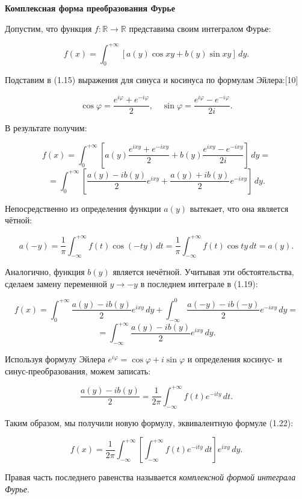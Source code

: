 \textbf{Комплексная форма преобразования Фурье}{
    
Допустим, что функция $f : \mathbb{R} \to \mathbb{R}$ представима своим интегралом Фурье:

\[
f(x) = \int_0^{+\infty} \left[ a(y) \cos xy + b(y) \sin xy \right] \, dy. \tag{1.15}
\]

Подставим в (1.15) выражения для синуса и косинуса по формулам Эйлера:[10]

\[
\cos \varphi = \frac{e^{i \varphi} + e^{-i \varphi}}{2}, \quad \sin \varphi = \frac{e^{i \varphi} - e^{-i \varphi}}{2i}. \tag{1.16}
\]

В результате получим:

\[
f(x) = \int_0^{+\infty} \left[ a(y) \frac{e^{i xy} + e^{-i xy}}{2} + b(y) \frac{e^{i xy} - e^{-i xy}}{2i} \right] \, dy =
\]
\[
= \int_0^{+\infty} \left[ \frac{a(y) - i b(y)}{2} e^{i xy} + \frac{a(y) + i b(y)}{2} e^{-i xy} \right] \, dy. \tag{1.17}
\]

Непосредственно из определения функции $a(y)$ вытекает, что она является чётной:

\[
a(-y) = \frac{1}{\pi} \int_{-\infty}^{+\infty} f(t) \cos (-t y) \, dt = \frac{1}{\pi} \int_{-\infty}^{+\infty} f(t) \cos t y \, dt = a(y). \tag{1.18}
\]

Аналогично, функция $b(y)$ является нечётной. Учитывая эти обстоятельства, сделаем замену переменной $y \to -y$ в последнем интеграле в (1.19):

\[
f(x) = \int_0^{+\infty} \frac{a(y) - i b(y)}{2} e^{i xy} \, dy + \int_{-\infty}^0 \frac{a(-y) - i b(-y)}{2} e^{-i xy} \, dy =
\]
\[
= \int_{-\infty}^{+\infty} \frac{a(y) - i b(y)}{2} e^{i xy} \, dy. \tag{1.20}
\]

Используя формулу Эйлера $e^{i \varphi} = \cos \varphi + i \sin \varphi$   и определения  косинус- и синус-преобразования, можем записать:

\[
\frac{a(y) - i b(y)}{2} = \frac{1}{2\pi} \int_{-\infty}^{+\infty} f(t) e^{-i t y} \, dt. \tag{1.22}
\]

Таким образом, мы получили новую формулу, эквивалентную формуле (1.22):

\[
f(x) = \frac{1}{2\pi} \int_{-\infty}^{+\infty} \left[ \int_{-\infty}^{+\infty} f(t) e^{-i t y} \, dt \right] e^{i x y} \, dy. \tag{1.23}
\]

Правая часть последнего равенства называется \textit{комплексной формой интеграла Фурье}.
}

